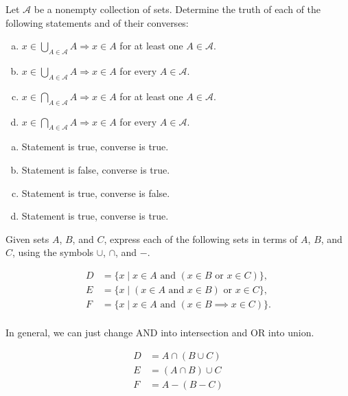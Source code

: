 \documentclass{zupan}
\begin{document}
\begin{problem}{5}
  Let $\mathscr{A}$ be a nonempty collection of sets. Determine the truth of
  each of the following statements and of their converses:

  \begin{enumerate}[(a), noitemsep]
    \item $x \in \bigcup_{A \in \mathscr{A}} A \Rightarrow x \in A$ for at
      least one $A \in \mathscr{A}$.
    \item $x \in \bigcup_{A \in \mathscr{A}} A \Rightarrow x \in A$ for every
      $A \in \mathscr{A}$.
    \item $x \in \bigcap_{A \in \mathscr{A}} A \Rightarrow x \in A$ for at
      least one $A \in \mathscr{A}$.
    \item $x \in \bigcap_{A \in \mathscr{A}} A \Rightarrow x \in A$ for every
      $A \in \mathscr{A}$.
  \end{enumerate}
\end{problem}

\begin{solution}
  \begin{enumerate}[(a), noitemsep]
    \item Statement is true, converse is true.
    \item Statement is false, converse is true.
    \item Statement is true, converse is false.
    \item Statement is true, converse is true.
  \end{enumerate}
\end{solution}

\begin{problem}{7}
  Given sets $A$, $B$, and $C$, express each of the following sets in terms of
  $A$, $B$, and $C$, using the symbols $\cup$, $\cap$, and $-$.

  \[
    \begin{aligned}
      D & = \{x \mid x \in A \text{ and } (x \in B \text{ or } x \in C)\}, \\
      E & = \{x \mid (x \in A \text{ and } x \in B) \text{ or } x \in C\}, \\
      F & = \{x \mid x \in A \text{ and } (x \in B \implies x \in C)\}. \\
    \end{aligned}
  \]
\end{problem}

\begin{solution}
  In general, we can just change AND into intersection and OR into union.

  \[
    \begin{aligned}
      D & = A \cap (B \cup C) \\
      E & = (A \cap B) \cup C \\
      F & = A - (B - C) \\
    \end{aligned}
  \]
\end{solution}
\end{document}
